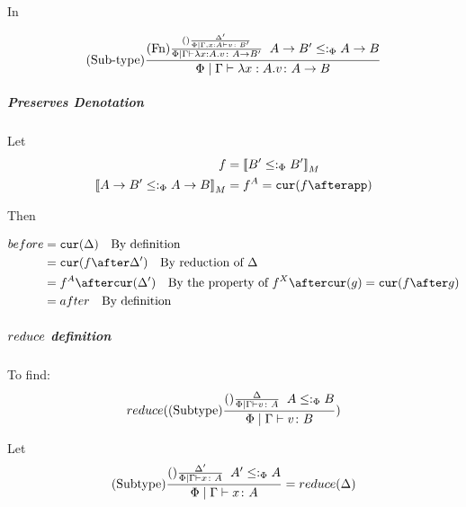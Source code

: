 \documentclass{report}
\begin{document}
                In

                \begin{equation}
                    (\text{Sub-type}) \frac{
                        (\text{Fn}) \frac{
                            (\text{}) \frac{
                                \Delta'
                            }{
                                \Phi\mid\Gamma, x: A \vdash v \colon B'
                            }    
                        }{
                            \Phi\mid\Gamma \vdash \lambda x : A. v \colon A\rightarrow B'
                        }
                        \;\;
                        A\rightarrow B'\leq:_\Phi A\rightarrow B
                    }{
                        \Phi\mid\Gamma \vdash \lambda x : A. v \colon A\rightarrow B
                    }
                \end{equation}

            \subparagraph{Preserves Denotation}
                Let
                \begin{align}
                    f &= \deno{B'\subtypep B'} \\
                    \deno{\fntype{A}{B'}\subtypep\fntype{A}{B}} & = f^A = \cur{f\after \app}
                \end{align}

                Then

                \begin{align}
                    before & = \cur{\D} \qt{By definition}\\
                            & = \cur{f\after\D'} \qt{By reduction of $\D$} \\
                            & = f^A\after\cur{\D'}\qt{By the property of $f^X\after\cur{g} = \cur{f\after g}$} \\
                            & = after \qt{By definition}\\
                \end{align}

            \subparagraph{$reduce$ definition}
            To find:
            \begin{equation}
                reduce((\text{Subtype}) \frac{(\text{}) \frac{\Delta}{\Phi\mid\Gamma \vdash v \colon A}\;\; A \leq:_\Phi B}{\Phi\mid\Gamma \vdash v \colon B})
            \end{equation}

            Let 
            \begin{equation}\label{SubtypeDeltaReduction}
                (\text{Subtype}) \frac{(\text{}) \frac{\Delta'}{\Phi\mid\Gamma \vdash x \colon A}\;\; A'\leq:_\Phi A}{\Phi\mid\Gamma \vdash x \colon A} = reduce(\Delta)
            \end{equation}
\end{document}
